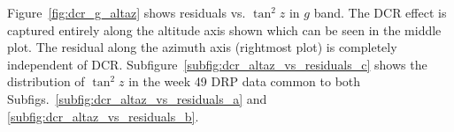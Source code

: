 Figure~\ref{fig:dcr_g_altaz} shows residuals vs. $\tan^2{z}$ in $g$ band. 
The DCR effect is captured entirely along the altitude axis shown which can be seen in the middle plot. 
The residual along the azimuth axis (rightmost plot) is completely independent of DCR.
Subfigure~\ref{subfig:dcr_altaz_vs_residuals_c} shows the distribution of $\tan^2{z}$ in the week 49 DRP data common to both Subfigs.~\ref{subfig:dcr_altaz_vs_residuals_a} and \ref{subfig:dcr_altaz_vs_residuals_b}.